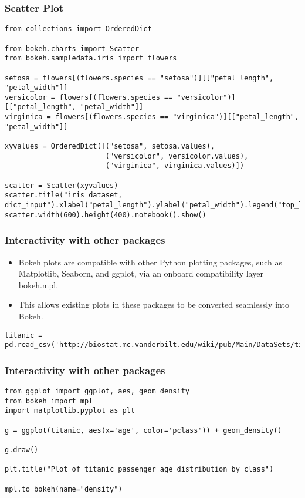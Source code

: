 \begin{frame}[fragile] \frametitle{Scatter Plot}
\begin{lstlisting}
from collections import OrderedDict

from bokeh.charts import Scatter
from bokeh.sampledata.iris import flowers

setosa = flowers[(flowers.species == "setosa")][["petal_length", "petal_width"]]
versicolor = flowers[(flowers.species == "versicolor")][["petal_length", "petal_width"]]
virginica = flowers[(flowers.species == "virginica")][["petal_length", "petal_width"]]

xyvalues = OrderedDict([("setosa", setosa.values), 
                        ("versicolor", versicolor.values), 
                        ("virginica", virginica.values)])

scatter = Scatter(xyvalues)
scatter.title("iris dataset, dict_input").xlabel("petal_length").ylabel("petal_width").legend("top_left")
scatter.width(600).height(400).notebook().show()
\end{lstlisting}
\end{frame}

\begin{frame}[fragile] \frametitle{Interactivity with other packages}
\begin{itemize}
\item Bokeh plots are compatible with other Python plotting packages, such as Matplotlib, Seaborn, and ggplot, via an onboard compatibility layer bokeh.mpl. 
\item This allows existing plots in these packages to be converted seamlessly into Bokeh.
\end{itemize}
\begin{lstlisting}
titanic = pd.read_csv('http://biostat.mc.vanderbilt.edu/wiki/pub/Main/DataSets/titanic3.csv')

\end{lstlisting}
\end{frame}

\begin{frame}[fragile] \frametitle{Interactivity with other packages}
\begin{lstlisting}
from ggplot import ggplot, aes, geom_density
from bokeh import mpl
import matplotlib.pyplot as plt

g = ggplot(titanic, aes(x='age', color='pclass')) + geom_density()

g.draw()

plt.title("Plot of titanic passenger age distribution by class")

mpl.to_bokeh(name="density")
\end{lstlisting}
\end{frame}

